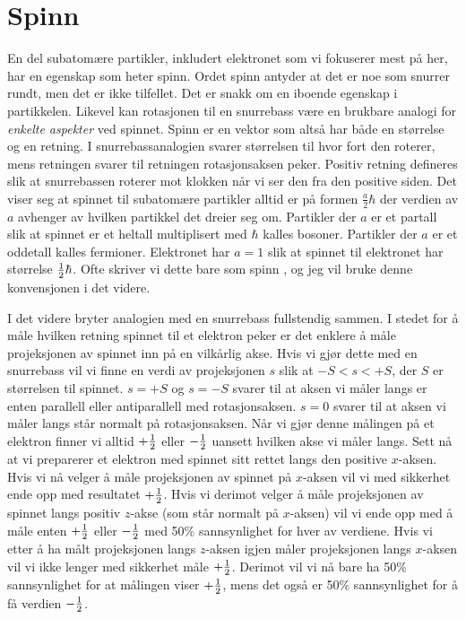 \section{Spinn}
\label{sec:kvante:spinn}
En del subatomære partikler, inkludert elektronet som vi fokuserer mest på her, har en egenskap som heter spinn. Ordet spinn antyder at det er noe som snurrer rundt, men det er ikke tilfellet. Det er snakk om en iboende egenskap i partikkelen. Likevel kan rotasjonen til en snurrebass være en brukbare analogi for \emph{enkelte aspekter} ved spinnet. Spinn er en vektor som altså har både en størrelse og en retning. I snurrebassanalogien svarer størrelsen til hvor fort den roterer, mens retningen svarer til retningen rotasjonsaksen peker. Positiv retning defineres slik at snurrebassen roterer mot klokken når vi ser den fra den positive siden. Det viser seg at spinnet til subatomære partikler alltid er på formen $\frac{a}{2}\hbar$ der verdien av $a$ avhenger av hvilken partikkel det dreier seg om. Partikler der $a$ er et partall slik at spinnet er et heltall multiplisert med $\hbar$ kalles bosoner. Partikler der $a$ er et oddetall kalles fermioner. Elektronet har $a = 1$ slik at spinnet til elektronet har størrelse $\frac{1}{2}\hbar$. Ofte skriver vi dette bare som spinn \half, og jeg vil bruke denne konvensjonen i det videre.

I det videre bryter analogien med en snurrebass fullstendig sammen. I stedet for å måle hvilken retning spinnet til et elektron peker er det enklere å måle projeksjonen av spinnet inn på en vilkårlig akse. Hvis vi gjør dette med en snurrebass vil vi finne en verdi av projeksjonen $s$ slik at  $-S < s < +S$, der $S$ er størrelsen til spinnet. $s=+S$ og $s=-S$ svarer til at aksen vi måler langs er enten parallell eller antiparallell med rotasjonsaksen. $s=0$ svarer til at aksen vi måler langs står normalt på rotasjonsaksen. Når vi gjør denne målingen på et elektron finner vi alltid $+\frac{1}{2}$ eller $-\frac{1}{2}$ uansett hvilken akse vi måler langs. Sett nå at vi preparerer et elektron med spinnet sitt rettet langs den positive $x$-aksen. Hvis vi nå velger å måle projeksjonen av spinnet på $x$-aksen vil vi med sikkerhet ende opp med resultatet $+\frac{1}{2}$. Hvis vi derimot velger å måle projeksjonen av spinnet langs positiv $z$-akse (som står normalt på $x$-aksen) vil vi ende opp med å måle enten $+\frac{1}{2}$ eller $-\frac{1}{2}$ med 50\% sannsynlighet for hver av verdiene. Hvis vi etter å ha målt projeksjonen langs $z$-aksen igjen måler projeksjonen langs $x$-aksen vil vi ikke lenger med sikkerhet måle $+\frac{1}{2}$. Derimot vil vi nå bare ha 50\% sannsynlighet for at målingen viser $+\frac{1}{2}$, mens det også er 50\% sannsynlighet for å få verdien $-\frac{1}{2}$. 

